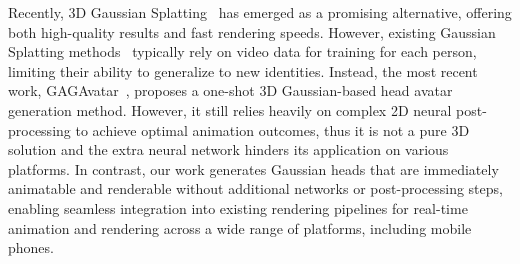 Recently, 3D Gaussian Splatting~\cite{GaussianSplatting} has emerged as a promising alternative, offering both high-quality results and fast rendering speeds. However, existing Gaussian Splatting methods~\cite{GaussianAvatar,DBLP:conf/cvpr/XuCL00ZL24} typically rely on video data for training for each person, limiting their ability to generalize to new identities. Instead, the most recent work, GAGAvatar~\cite{GAGAvatar}, proposes a one-shot 3D Gaussian-based head avatar generation method. However, it still relies heavily on complex 2D neural post-processing to achieve optimal animation outcomes, thus it is not a pure 3D solution and the extra neural network hinders its application on various platforms. In contrast, our work generates Gaussian heads that are immediately animatable and renderable without additional networks or post-processing steps, enabling seamless integration into existing rendering pipelines for real-time animation and rendering across a wide range of platforms, including mobile phones. 